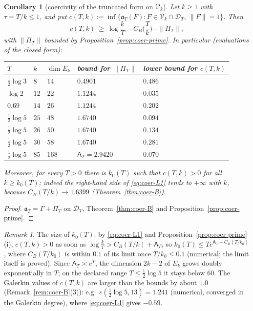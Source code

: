 \documentclass[11pt]{amsart}
\newtheorem{corollary}[theorem]{Corollary}
\theoremstyle{definition}
\theoremstyle{remark}
\newtheorem{remark}[theorem]{Remark}
\newcommand{\Aconst}{\mathsf A_T}
\newcommand{\PiT}{\Pi_T}
\begin{document}
\begin{corollary}[coercivity of the truncated form on $\mathcal V_k$]\label{cor:coer-L1}
Let $k\ge1$ with $\tau=T/k\le1$, and put $c(T,k):=\inf\{\mathfrak a_T(F):F\in\mathcal V_k\cap\mathcal D_T,\ \|F\|=1\}$. Then
\begin{equation}\label{eq:coer-L1}
c(T,k)\ \ge\ \log\frac kT-C_B\Big(\frac Tk\Big)-\|\PiT\| ,
\end{equation}
with $\|\PiT\|$ bounded by Proposition~\ref{prop:coer-prime}. In particular (evaluations of the closed form):
\begin{center}
\begin{tabular}{@{}lllll@{}}
\toprule
$T$ & $k$ & $\dim E_k$ & bound for $\|\PiT\|$ & lower bound for $c(T,k)$\\
\midrule
$\frac12\log3$ & $8$ & $14$ & $0.4901$ & $0.486$\\
$\log2$ & $12$ & $22$ & $1.1244$ & $0.035$\\
$0.69$ & $14$ & $26$ & $1.1244$ & $0.202$\\
$\frac12\log5$ & $25$ & $48$ & $1.6740$ & $0.094$\\
$\frac12\log5$ & $26$ & $50$ & $1.6740$ & $0.134$\\
$\frac12\log5$ & $30$ & $58$ & $1.6740$ & $0.281$\\
$\frac12\log5$ & $85$ & $168$ & $\Aconst=2.9420$ & $0.070$\\
\bottomrule
\end{tabular}
\end{center}
Moreover, for every $T>0$ there is $k_0(T)$ such that $c(T,k)>0$ for all $k\ge k_0(T)$; indeed the right-hand side
of \eqref{eq:coer-L1} tends to $+\infty$ with $k$, because $C_B(T/k)\to1.6399$ (Theorem~\ref{thm:coer-B}).
\end{corollary}
\begin{proof}
$\mathfrak a_T=\Gamma+\PiT$ on $\mathcal D_T$, Theorem~\ref{thm:coer-B} and Proposition~\ref{prop:coer-prime}.
\end{proof}

\begin{remark}\label{rem:coer-size}
The size of $k_0(T)$: by \eqref{eq:coer-L1} and Proposition~\ref{prop:coer-prime}(i), $c(T,k)>0$ as soon as
$\log\frac kT>C_B(T/k)+\Aconst$, so $k_0(T)\le Te^{\Aconst+C_B(T/k_0)}$, where $C_B(T/k_0)$ is within $0.1$ of
its limit once $T/k_0\le0.1$ (numerical; the limit itself is proved). Since $\Aconst\asymp e^T$, the dimension
$2k-2$ of $E_k$ grows doubly exponentially in $T$; on the declared range $T\le\frac12\log5$ it stays below $60$.
The Galerkin values of $c(T,k)$ are larger than the bounds by about $1.0$ (Remark~\ref{rem:coer-B}(3)):
e.g.\ $c(\frac12\log5,13)=1.241$ (numerical, converged in the Galerkin degree), where \eqref{eq:coer-L1} gives
$-0.59$.
\end{remark}
\end{document}
